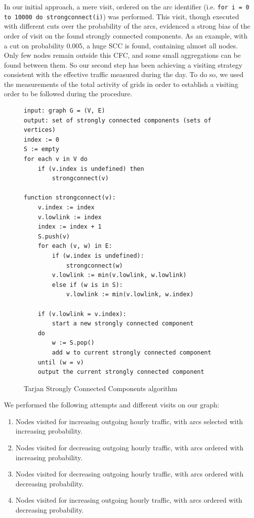 \documentclass[12pt,a4paper]{article}
\begin{document}
In our initial approach, a mere visit, ordered on the arc identifier (i.e. \texttt{for i = 0 to 10000 do strongconnect(i)}) was performed. This visit, though executed with different cuts over the probability of the arcs, evidenced
a strong bias of the order of visit on the found strongly connected components.
As an example, with a cut on probability 0.005, a huge SCC is found, containing almost all nodes. Only few nodes remain
outside this CFC, and some small aggregations can be found between them.
So our second step has been achieving a visiting strategy consistent with the effective traffic measured during the day.
To do so, we used the measurements of the total activity of grids in order to establish a visiting order to be 
followed during the procedure.
\begin{figure}
\begin{verbatim}
input: graph G = (V, E)
output: set of strongly connected components (sets of vertices)
index := 0
S := empty
for each v in V do
    if (v.index is undefined) then
        strongconnect(v)
		
function strongconnect(v):
    v.index := index
    v.lowlink := index
    index := index + 1
    S.push(v)
    for each (v, w) in E:
        if (w.index is undefined):
            strongconnect(w)
        v.lowlink := min(v.lowlink, w.lowlink)
		else if (w is in S):
            v.lowlink := min(v.lowlink, w.index)
    
    if (v.lowlink = v.index):
        start a new strongly connected component
	do
        w := S.pop()
        add w to current strongly connected component
    until (w = v)
    output the current strongly connected component
\end{verbatim}
\caption{Tarjan Strongly Connected Components algorithm}
\label{alg:tarjan}
\end{figure}
We performed the following attempts and different visits on our graph:
\begin{enumerate}
\item Nodes visited for increasing outgoing hourly traffic, with arcs selected with increasing probability. 
\item Nodes visited for decreasing outgoing hourly traffic, with arcs ordered with increasing probability.
\item Nodes visited for decreasing outgoing hourly traffic, with arcs ordered with decreasing probability.
\item Nodes visited for increasing outgoing hourly traffic, with arcs ordered with decreasing probability.
\end{enumerate}
\end{document}
